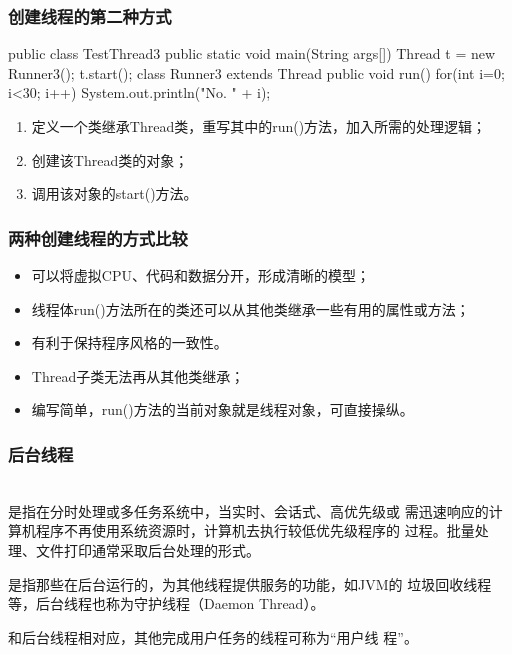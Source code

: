 \begin{frame}[fragile] %
  \frametitle{创建线程的第二种方式}

  \begin{javaCode}
    public class TestThread3 {
      public static void main(String args[]) {
        Thread t = new Runner3();
        t.start();
      }
    }
    class Runner3 extends Thread {
      public void run() {
        for(int i=0; i<30; i++) {
          System.out.println("No. " + i);
        }
      }
    }
  \end{javaCode}

  \begin{enumerate}
  \item 定义一个类继承Thread类，重写其中的run()方法，加入所需的处理逻辑；
  \item 创建该Thread类的对象；
  \item 调用该对象的start()方法。
  \end{enumerate}
\end{frame}

\begin{frame}[fragile] %
  \frametitle{两种创建线程的方式比较}
  \begin{itemize}
  \item 可以将虚拟CPU、代码和数据分开，形成清晰的模型；
  \item 线程体run()方法所在的类还可以从其他类继承一些有用的属性或方法；
  \item 有利于保持程序风格的一致性。
  \end{itemize}

  \pause
  
  \begin{itemize}
  \item Thread子类无法再从其他类继承；
  \item 编写简单，run()方法的当前对象就是线程对象，可直接操纵。
  \end{itemize}
\end{frame}

\begin{frame}[fragile] %
  \frametitle{后台线程}

  \\
   是指在分时处理或多任务系统中，当实时、会话式、高优先级或
  需迅速响应的计算机程序不再使用系统资源时，计算机去执行较低优先级程序的
  过程。批量处理、文件打印通常采取后台处理的形式。\pause

   是指那些在后台运行的，为其他线程提供服务的功能，如JVM的
  垃圾回收线程等，后台线程也称为守护线程（Daemon Thread）。\pause

   和后台线程相对应，其他完成用户任务的线程可称为“用户线
  程”。
\end{frame}

